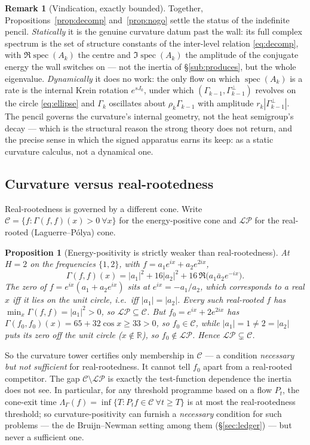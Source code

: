 \documentclass[11pt,reqno]{amsart}
\theoremstyle{plain}
\newtheorem{proposition}[theorem]{Proposition}
\theoremstyle{definition}
\newtheorem{remark}[theorem]{Remark}
\newcommand{\R}{\mathbb{R}}
\newcommand{\LP}{\mathcal{LP}}
\newcommand{\Gam}{\Gamma}
\DeclareMathOperator{\spec}{spec}
\begin{document}
\begin{remark}[Vindication, exactly bounded]
Together, Propositions~\ref{prop:decomp} and~\ref{prop:nogo} settle the status of
the indefinite pencil. \emph{Statically} it is the genuine curvature datum past the
wall: its full complex spectrum is the set of structure constants of the
inter-level relation \eqref{eq:decomp}, with $\Re\spec(A_k)$ the centre and
$\Im\spec(A_k)$ the amplitude of the conjugate energy the wall switches on ---
not the inertia of \S\ref{sub:produces}, but the whole eigenvalue. \emph{Dynamically}
it does no work: the only flow on which $\spec(A_k)$ is a rate is the internal
Krein rotation $e^{sJ_0}$, under which $(\Gam_{k-1},\Gam^{\perp}_{k-1})$ revolves on
the circle \eqref{eq:ellipse} and $\Gam_k$ oscillates about $\rho_k\Gam_{k-1}$ with
amplitude $r_k|\Gam^{\perp}_{k-1}|$. The pencil governs the curvature's internal
geometry, not the heat semigroup's decay --- which is the structural reason the
strong theory does not return, and the precise sense in which the signed apparatus
earns its keep: as a static curvature calculus, not a dynamical one.
\end{remark}

\subsection{Curvature versus real-rootedness}
Real-rootedness is governed by a different cone. Write
$\mathcal C=\{f:\Gam(f,f)(x)>0\ \forall x\}$ for the energy-positive cone and
$\LP$ for the real-rooted (Laguerre--P\'olya) cone.

\begin{proposition}[Energy-positivity is strictly weaker than real-rootedness]
\label{prop:LPC}
At $H=2$ on the frequencies $\{1,2\}$, with $f=a_1e^{ix}+a_2e^{2ix}$,
\[
  \Gam(f,f)(x)=|a_1|^2+16|a_2|^2+16\,\Re\!\bigl(a_1\bar a_2e^{-ix}\bigr).
\]
The zero of $f=e^{ix}(a_1+a_2e^{ix})$ sits at $e^{ix}=-a_1/a_2$, which corresponds
to a real $x$ iff it lies on the unit circle, i.e.\ iff $|a_1|=|a_2|$. Every such
real-rooted $f$ has $\min_x\Gam(f,f)=|a_1|^2>0$, so $\LP\subseteq\mathcal C$. But
$f_0=e^{ix}+2e^{2ix}$ has $\Gam(f_0,f_0)(x)=65+32\cos x\ge33>0$, so
$f_0\in\mathcal C$, while $|a_1|=1\ne2=|a_2|$ puts its zero off the unit circle
($x\notin\R$), so $f_0\notin\LP$. Hence $\LP\subsetneq\mathcal C$.
\end{proposition}

So the curvature tower certifies only membership in $\mathcal C$ --- a condition
\emph{necessary but not sufficient} for real-rootedness. It cannot tell $f_0$
apart from a real-rooted competitor. The gap $\mathcal C\setminus\LP$ is exactly
the test-function dependence the inertia does not see. In particular, for any
threshold programme based on a flow $P_t$, the cone-exit time
$\Lambda_\Gamma(f)=\inf\{T:P_tf\in\mathcal C\ \forall t\ge T\}$ is at most the
real-rootedness threshold; so curvature-positivity can furnish a \emph{necessary}
condition for such problems --- the de Bruijn--Newman setting among them
(\S\ref{sec:ledger}) --- but never a sufficient one.
\end{document}

